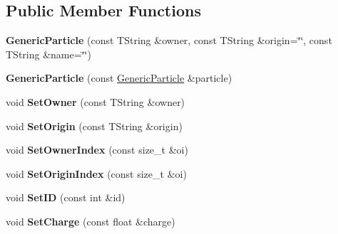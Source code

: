 \subsection*{Public Member Functions}
\begin{DoxyCompactItemize}
\item 
\hypertarget{class_h_a_l_1_1_generic_particle_add9ff51f2413528b2b00df1a4b7d67a5}{{\bfseries Generic\+Particle} (const T\+String \&owner, const T\+String \&origin=\char`\"{}\char`\"{}, const T\+String \&name=\char`\"{}\char`\"{})}\label{class_h_a_l_1_1_generic_particle_add9ff51f2413528b2b00df1a4b7d67a5}

\item 
\hypertarget{class_h_a_l_1_1_generic_particle_a1e9e01f96e31e980b2c31af42bb1c514}{{\bfseries Generic\+Particle} (const \hyperlink{class_h_a_l_1_1_generic_particle}{Generic\+Particle} \&particle)}\label{class_h_a_l_1_1_generic_particle_a1e9e01f96e31e980b2c31af42bb1c514}

\item 
\hypertarget{class_h_a_l_1_1_generic_particle_aca5a97bce5a002bd84259a417965f96e}{void {\bfseries Set\+Owner} (const T\+String \&owner)}\label{class_h_a_l_1_1_generic_particle_aca5a97bce5a002bd84259a417965f96e}

\item 
\hypertarget{class_h_a_l_1_1_generic_particle_a91b82bc5204850ab0d40163ed103ee12}{void {\bfseries Set\+Origin} (const T\+String \&origin)}\label{class_h_a_l_1_1_generic_particle_a91b82bc5204850ab0d40163ed103ee12}

\item 
\hypertarget{class_h_a_l_1_1_generic_particle_ae752a3a3a41281887a2ee988957cc6d9}{void {\bfseries Set\+Owner\+Index} (const size\+\_\+t \&oi)}\label{class_h_a_l_1_1_generic_particle_ae752a3a3a41281887a2ee988957cc6d9}

\item 
\hypertarget{class_h_a_l_1_1_generic_particle_a81d7aa1fd86d8f1d7e78286f32840e90}{void {\bfseries Set\+Origin\+Index} (const size\+\_\+t \&oi)}\label{class_h_a_l_1_1_generic_particle_a81d7aa1fd86d8f1d7e78286f32840e90}

\item 
\hypertarget{class_h_a_l_1_1_generic_particle_aa125325fe47360c75036732b90ca2c5b}{void {\bfseries Set\+I\+D} (const int \&id)}\label{class_h_a_l_1_1_generic_particle_aa125325fe47360c75036732b90ca2c5b}

\item 
\hypertarget{class_h_a_l_1_1_generic_particle_a06e76eefefa12e67947c8e3cfd0ab401}{void {\bfseries Set\+Charge} (const float \&charge)}\label{class_h_a_l_1_1_generic_particle_a06e76eefefa12e67947c8e3cfd0ab401}


\end{DoxyCompactItemize}
